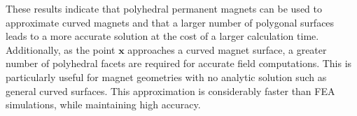 These results indicate that polyhedral permanent magnets can be used to approximate curved magnets and that a larger number of polygonal surfaces leads to a more accurate solution at the cost of a larger calculation time. Additionally, as the point \(\mathbf{x}\) approaches a curved magnet surface, a greater number of polyhedral facets are required for accurate field computations. This is particularly useful for magnet geometries with no analytic solution such as general curved surfaces. This approximation is considerably faster than FEA simulations, while maintaining high accuracy.